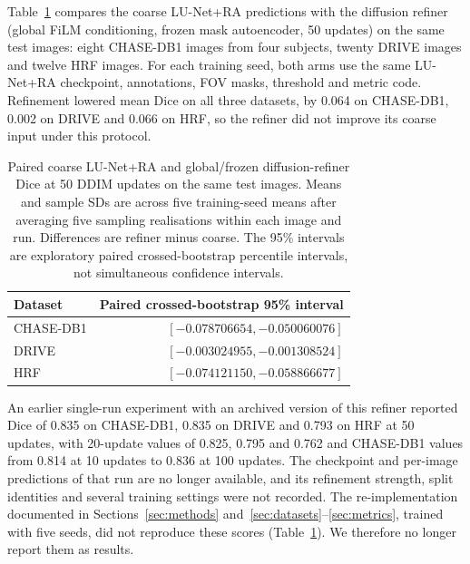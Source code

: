 \documentclass[jimaging,article,submit,pdftex,moreauthors]
  {Definitions/mdpi}
\newcommand{\revbegin}{\begingroup\color{blue}}
\newcommand{\revbegin}{\begingroup}
\newcommand{\revend}{\ifhmode\par\fi\endgroup}
\providecommand{\linelabel}[1]{}
\newcommand{\secend}[1]{\linelabel{rev:end:#1}}
\begin{document}
\revbegin{}Table~\ref{tab:segmentation_results} compares the coarse LU-Net+RA predictions with the diffusion refiner (global FiLM conditioning, frozen mask autoencoder, 50 updates) on the same test images: eight CHASE-DB1 images from four subjects, twenty DRIVE images and twelve HRF images. For each training seed, both arms use the same LU-Net+RA checkpoint, annotations, FOV masks, threshold and metric code. Refinement lowered mean Dice on all three datasets, by 0.064 on CHASE-DB1, 0.002 on DRIVE and 0.066 on HRF, so the refiner did not improve its coarse input under this protocol.

\begin{table}[htbp]\revbegin{}
\centering
\caption{Paired coarse LU-Net+RA and global/frozen diffusion-refiner Dice at 50 DDIM updates on the same test images. Means and sample SDs are across five training-seed means after averaging five sampling realisations within each image and run. Differences are refiner minus coarse. The 95\% intervals are exploratory paired crossed-bootstrap percentile intervals, not simultaneous confidence intervals.}
\label{tab:segmentation_results}
\small
{}
\par\medskip
\begin{tabular}{lr}
\toprule
Dataset & Paired crossed-bootstrap 95\% interval \\
\midrule
CHASE-DB1 & $[-0.078706654,-0.050060076]$ \\
DRIVE & $[-0.003024955,-0.001308524]$ \\
HRF & $[-0.074121150,-0.058866677]$ \\
\bottomrule
\end{tabular}
\revend{}\end{table}

An earlier single-run experiment with an archived version of this refiner reported Dice of 0.835 on CHASE-DB1, 0.835 on DRIVE and 0.793 on HRF at 50 updates, with 20-update values of 0.825, 0.795 and 0.762 and CHASE-DB1 values from 0.814 at 10 updates to 0.836 at 100 updates. The checkpoint and per-image predictions of that run are no longer available, and its refinement strength, split identities and several training settings were not recorded. The re-implementation documented in Sections~\ref{sec:methods} and~\ref{sec:datasets}--\ref{sec:metrics}, trained with five seeds, did not reproduce these scores (Table~\ref{tab:segmentation_results}). We therefore no longer report them as results.\secend{quantitative}
\end{document}
